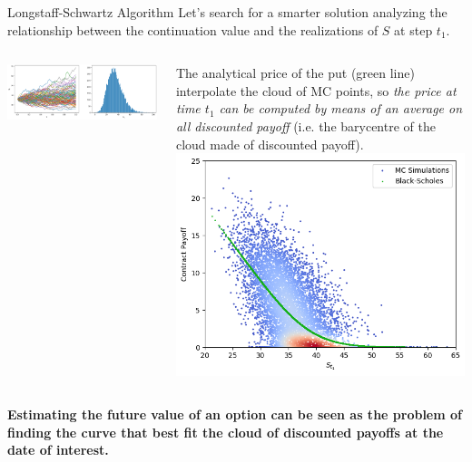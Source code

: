 \documentclass{beamer}
\begin{document}
\begin{frame}{Longstaff-Schwartz Algorithm}
Let's search for a smarter solution analyzing the relationship between the continuation value and the realizations of $S$ at step $t_1$.
\begin{columns}
    \includegraphics[width=0.9\linewidth]{images/longstaff_simulation}
    
    \small{The analytical price of the put (green line) interpolate the cloud of MC points, so \emph{the price at time $t_1$ can be computed by means of an average on all discounted payoff} (i.e. the barycentre of the cloud made of discounted payoff).}
    \includegraphics[width=0.9\linewidth]{images/longstaff_scatter_1}
\end{columns}

\textbf{Estimating the future value of an option can be seen as the problem of finding the curve that best fit the cloud of discounted payoffs at the date of interest.}
\end{frame}
\end{document}
